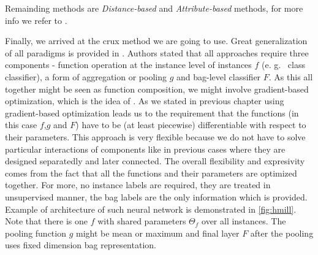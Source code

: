 Remainding methods are \emph{Distance-based} and \emph{Attribute-based} methods, for more info we refer to \cite{Amores2013}.

Finally, we arrived at the crux method we are going to use. Great generalization of all paradigms is provided in \cite{Mandlik2020}. Authors stated that all approaches require three components - function operation at the instance level of instances $f$ (e. g. \ class classifier), a form of aggregation or pooling $g$ and bag-level classifier $F$. As this all together might be seen as function composition, we might involve gradient-based optimization, which is the idea of \cite{Pevny2016a, Edwards2017}. As we stated in previous chapter using gradient-based optimization leads us to the requirement that the functions (in this case $f$,$g$ and $F$) have to be (at least piecewise) differentiable with respect to their parameters. This approach is very flexible because we do not have to solve particular interactions of components like in previous cases where they are designed separatedly and later connected. The overall flexibility and expresivity comes from the fact that all the functions and their parameters are optimized together. For more, no instance labels are required, they are treated in unsupervised manner, the bag labels are the only information which is provided. Example of architecture of such neural network is demonstrated in \ref{fig:hmill}. Note that there is one $f$ with shared parameters $\Theta_{f}$ over all instances. The pooling function $g$ might be mean or maximum and final layer $F$ after the pooling uses fixed dimension bag representation.


